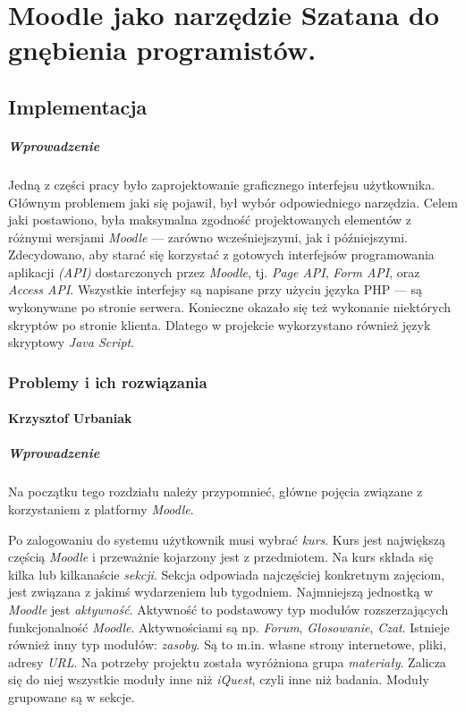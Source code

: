\documentclass[12pt]{report}
\begin{document}

\part{Moodle jako narzędzie Szatana do gnębienia programistów.}
\chapter{Implementacja}
\subsubsection{Wprowadzenie}
Jedną z części pracy było zaprojektowanie graficznego interfejsu użytkownika. Głównym problemem jaki się pojawił, był wybór odpowiedniego narzędzia. Celem jaki postawiono, była maksymalna zgodność projektowanych elementów z różnymi wersjami \emph{Moodle} --- zarówno wcześniejszymi, jak i późniejszymi. Zdecydowano, aby starać się korzystać z gotowych interfejsów programowania aplikacji \emph{(API)} dostarczonych przez \emph{Moodle}, tj. \emph{Page API}, \emph{Form API}, oraz \emph{Access API}. Wszystkie interfejsy są napisane przy użyciu języka PHP --- są wykonywane po stronie serwera. Konieczne okazało się też wykonanie niektórych skryptów po stronie klienta. Dlatego w projekcie wykorzystano również język skryptowy \emph{Java Script}.

\section{Problemy i ich rozwiązania}
\subsection{Krzysztof Urbaniak}
\subsubsection{Wprowadzenie}
Na początku tego rozdziału należy przypomnieć, główne pojęcia związane z korzystaniem z platformy \emph{Moodle}.

Po zalogowaniu do systemu użytkownik musi wybrać \emph{kurs}. Kurs jest największą częścią \emph{Moodle} i przeważnie kojarzony jest z przedmiotem. Na kurs składa się kilka lub kilkanaście \emph{sekcji}. Sekcja odpowiada najczęściej konkretnym zajęciom, jest związana z jakimś wydarzeniem lub tygodniem. Najmniejszą jednostką w \emph{Moodle} jest \emph{aktywność}. Aktywność to podstawowy typ modułów rozszerzających funkcjonalność \emph{Moodle}. Aktywnościami są np. \emph{Forum}, \emph{Głosowanie}, \emph{Czat}. Istnieje również inny typ modułów: \emph{zasoby}. Są to m.in. własne strony internetowe, pliki, adresy \emph{URL}. Na potrzeby projektu została wyróżniona grupa \emph{materiały}. Zalicza się do niej wszystkie moduły inne niż \emph{iQuest}, czyli inne niż badania. Moduły grupowane są w sekcje.
\end{document}

